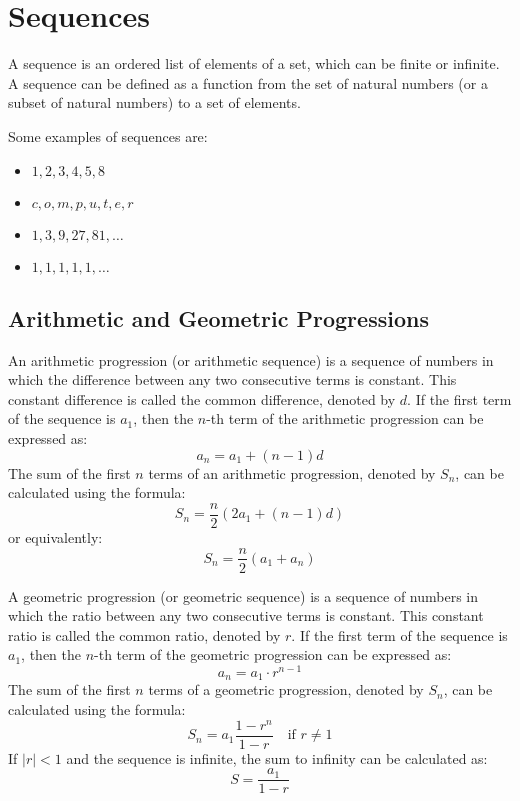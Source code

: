 \section{Sequences}
\begin{definition}[Sequence]
    A sequence is an ordered list of elements of a set, which can be finite or infinite. A sequence can be defined as a function from the set of natural numbers (or a subset of natural numbers) to a set of elements.
\end{definition}
\begin{eg}
    Some examples of sequences are:
    \begin{itemize}[itemsep=1pt,label=$\circ$]
        \item $1,2,3,4,5,8$
        \item $c,o,m,p,u,t,e,r$
        \item $1,3,9,27,81, \ldots$
        \item $1,1,1,1,1,\ldots$
    \end{itemize}
\end{eg}

\subsection{Arithmetic and Geometric Progressions}
\begin{definition}
    An arithmetic progression (or arithmetic sequence) is a sequence of numbers in which the difference between any two consecutive terms is constant. This constant difference is called the common difference, denoted by $d$. If the first term of the sequence is $a_1$, then the $n$-th term of the arithmetic progression can be expressed as:
    \[ a_n = a_1 + (n-1)d \]
    The sum of the first $n$ terms of an arithmetic progression, denoted by $S_n$, can be calculated using the formula:
    \[ S_n = \frac{n}{2} (2a_1 + (n-1)d) \]
    or equivalently:
    \[ S_n = \frac{n}{2} (a_1 + a_n) \]
\end{definition}

\begin{definition}
    A geometric progression (or geometric sequence) is a sequence of numbers in which the ratio between any two consecutive terms is constant. This constant ratio is called the common ratio, denoted by $r$. If the first term of the sequence is $a_1$, then the $n$-th term of the geometric progression can be expressed as:
    \[ a_n = a_1 \cdot r^{n-1} \]
    The sum of the first $n$ terms of a geometric progression, denoted by $S_n$, can be calculated using the formula:
    \[ S_n = a_1 \frac{1 - r^n}{1 - r} \quad \text{if } r \neq 1 \]
    If $|r| < 1$ and the sequence is infinite, the sum to infinity can be calculated as:
    \[ S = \frac{a_1}{1 - r} \]
\end{definition}

